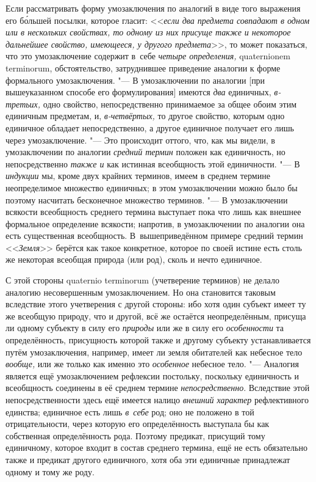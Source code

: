 Если рассматривать форму умозаключения по аналогий в виде того
выражения его б\'{о}льшей посылки, которое гласит:
<<{\em если два предмета совпадают в
одном или в нескольких свойствах, то одному из них присуще также и
некоторое дальнейшее свойство, имеющееся, у другого предмета}>>,
то может показаться, что это умозаключение содержит в~себе
{\em четыре определения,} quaterni\-onem
termi\-norum, обстоятельство, затруднившее приведение аналогии
к форме формального умозаключения. "--- В умозаключении по
аналогии [при вышеуказанном способе его формулирования] имеются
{\em два} единичных,
{\em в-третьих,} одно
свойство, непосредственно принимаемое за общее обоим этим единичным
предметам, и, {\em в-четвёртых,}
то другое свойство, которым одно единичное обладает
непосредственно, а другое единичное получает его лишь через умозаключение.
"--- Это происходит оттого, что, как мы видели, в умозаключении
по аналогии {\em средний термин}
положен как единичность, но непосредственно
{\em также и} как
истинная всеобщность этой единичности. "--- В
{\em индукции} мы, кроме
двух крайних терминов, имеем в среднем термине неопределимое множество
единичных; в этом умозаключении можно было бы поэтому насчитать бесконечное
множество терминов. "--- В умозаключении всякости всеобщность
среднего термина выступает пока что лишь как внешнее формальное определение
всякости; напротив, в умозаключении по аналогии она есть существенная
всеобщность. В~вышеприведённом примере средний термин
<<{\em Земля}>> берётся как
такое конкретное, которое по своей истине есть столь же некоторая всеобщая
природа (или род), сколь и нечто единичное.

С этой стороны quaternio terminorum
(учетверение терминов) не делало аналогию несовершенным
умозаключением. Но она становится таковым вследствие этого учетверения с
другой стороны: ибо хотя один субъект имеет ту же всеобщую природу, что и
другой, всё же остаётся неопределённым, присуща ли одному субъекту в силу
его {\em природы} или же
в силу его {\em особенности}
та определённость, присущность которой также и другому
субъекту устанавливается путём умозаключения, например, имеет ли земля
обитателей как небесное тело
{\em вообще,} или же
только как именно это {\em особенное}
небесное тело. "--- Аналогия является ещё
умозаключением рефлексии постольку, поскольку единичность и всеобщность
соединены в её среднем термине
{\em непосредственно}.
Вследствие этой непосредственности здесь ещё имеется налицо
{\em внешний характер}
рефлективного единства; единичное есть лишь
{\em в~себе} род; оно не
положено в той отрицательности, через которую его определённость выступала
бы как собственная определённость рода. Поэтому предикат, присущий тому
единичному, которое входит в состав среднего термина, ещё не есть
обязательно также и предикат другого единичного, хотя оба эти единичные
принадлежат одному и тому же роду.

